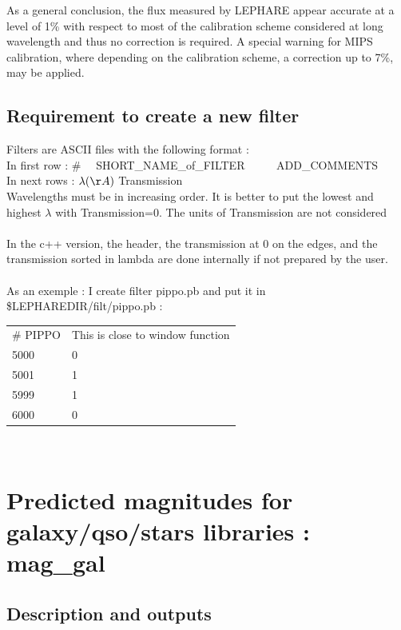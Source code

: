 \documentclass[12pt]{article}
\begin{document}
%  
As a general conclusion, the flux measured by LEPHARE appear accurate at a level of  1\% with respect
to most of the calibration scheme considered at long wavelength and thus no correction is required.  
A special warning for MIPS calibration, where depending on the calibration scheme, a correction up to 7\%, may be applied. 
%
\subsection{Requirement to create a new  filter}

Filters are ASCII files with the following format : \\
 In first row : \#  \ \ SHORT\_NAME\_of\_FILTER  \ \ \ \ \   ADD\_COMMENTS \\  
 In next rows :   $\lambda (\AA)$   Transmission    \\
 Wavelengths must be in increasing order.
 It is better to put the lowest and highest $\lambda$ with Transmission=0. 
 The units of Transmission are not considered \\
 \\
 In the c++ version, the header, the transmission at 0 on the edges, and the transmission sorted in lambda are done internally if not prepared by the user.\\
\\
%
 As an exemple : I create  filter pippo.pb  and put it in \$LEPHAREDIR/filt/pippo.pb : \\
  
\begin{tabular}{ll}
 \#  PIPPO & This is close to window function   \\
 5000 & 0          \\
 5001 & 1          \\
 5999 & 1          \\
 6000 & 0          \\
\end{tabular}\\


\newpage

\section{Predicted magnitudes for galaxy/qso/stars libraries : {\bf mag\_gal}}
\label{sec:mag_gal}


\subsection{Description and outputs}
 
\end{document}
